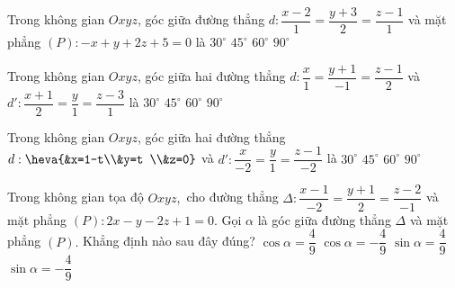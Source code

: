 	\begin{ex}%
	Trong không gian $Oxyz$, góc giữa đường thẳng $d:\dfrac{x-2}{1}=\dfrac{y+3}{2}=\dfrac{z-1}{1}$ và mặt phẳng $(P):-x+y+2z+5=0$ là
	\choice
	{$30^{\circ}$}
	{\True $45^{\circ}$}
	{$60^{\circ}$}
	{$90^{\circ}$}
	\end{ex}
	\begin{ex}%
	Trong không gian $Oxyz$, góc giữa hai đường thẳng $d:\dfrac{x}{1}=\dfrac{y+1}{-1}=\dfrac{z-1}{2}$ và $d': \dfrac{x+1}{2}=\dfrac{y}{1}=\dfrac{z-3}{1}$ là 
	\choice
	{$30^{\circ}$}
	{$45^{\circ}$}
	{\True $60^{\circ}$}
	{$90^{\circ}$}
	\end{ex}
	\begin{ex}%
	Trong không gian $Oxyz$, góc giữa hai đường thẳng $d:\heva{&x=1-t\\&y=t \\&z=0}$ và  $d': \dfrac{x}{-2}=\dfrac{y}{1}=\dfrac{z-1}{-2}$ là 
	\choice
	{$30^{\circ}$}
	{\True $45^{\circ}$}
	{$60^{\circ}$}
	{$90^{\circ}$}
	\end{ex}
	\begin{ex}%
	Trong không gian tọa độ $Oxyz,$ cho đường thẳng $\Delta\colon \dfrac{x-1}{-2}=\dfrac{y+1}2=\dfrac{z-2}{-1}$ và mặt phẳng $(P)\colon 2x-y-2z+1=0.$ Gọi $\alpha$ là góc giữa đường thẳng $\Delta$ và mặt phẳng $(P).$ Khẳng định nào sau đây đúng?
	\choice
	{$\cos \alpha=\dfrac49$}
	{$\cos \alpha=-\dfrac49$}
	{\True $\sin \alpha=\dfrac49$}
	{$\sin \alpha=-\dfrac49$}
	\end{ex}
